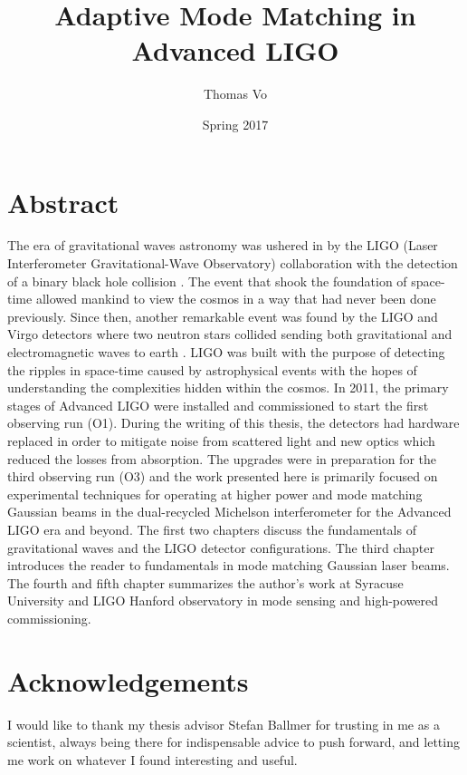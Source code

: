 \documentclass[oneside,12pt]{book}
\title{Adaptive Mode Matching in Advanced LIGO}
\date{Spring 2017}
\author{Thomas Vo}
\begin{document}
	
\doublespacing

	\chapter*{Abstract}
	The era of gravitational waves astronomy was ushered in by the LIGO (Laser Interferometer Gravitational-Wave Observatory) collaboration with the detection of a binary black hole collision \cite{DetectionPaper}.  The event that shook the foundation of space-time allowed mankind to view the cosmos in a way that had never been done previously. Since then, another remarkable event was found by the LIGO and Virgo detectors where two neutron stars collided sending both gravitational and electromagnetic waves to earth \cite{BNS}. LIGO was built with the purpose of detecting the ripples in space-time caused by astrophysical events with the hopes of understanding the complexities hidden within the cosmos.  In 2011, the primary stages of Advanced LIGO were installed and commissioned to start the first observing run (O1).  During the writing of this thesis, the detectors had hardware replaced in order to mitigate noise from scattered light and new optics which reduced the losses from absorption.  The upgrades were in preparation for the third observing run (O3) and the work presented here is primarily focused on experimental techniques for operating at higher power and mode matching Gaussian beams in the dual-recycled Michelson interferometer for the Advanced LIGO era and beyond.  The first two chapters discuss the fundamentals of gravitational waves and the LIGO detector configurations.  The third chapter introduces the reader to fundamentals in mode matching Gaussian laser beams.  The fourth and fifth chapter summarizes the author's work at Syracuse University and LIGO Hanford observatory in mode sensing and high-powered commissioning. 
	
	\maketitle

\chapter*{Acknowledgements}

I would like to thank my thesis advisor Stefan Ballmer for trusting in me as a scientist, always being there for indispensable advice to push forward, and letting me work on whatever I found interesting and useful.
\end{document}
